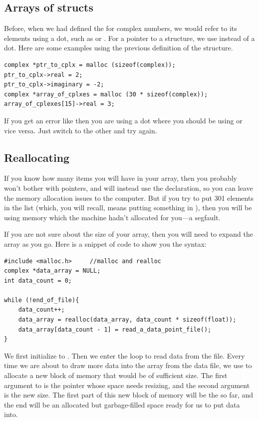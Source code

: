 \subsection{Arrays of structs}	\ckeyind{->}
Before, when we had defined the  for complex numbers, we would refer to its elements using a
dot, such as  or . For a pointer to a structure, we use \ci{->} instead of 
a dot.  Here are some examples using the previous definition of the  structure.
\begin{lstlisting}
complex *ptr_to_cplx = malloc (sizeof(complex));
ptr_to_cplx->real = 2;
ptr_to_cplx->imaginary = -2;
complex *array_of_cplxes = malloc (30 * sizeof(complex));
array_of_cplexes[15]->real = 3;
\end{lstlisting}

If you get an error like  then you are
using a dot where you should be using \ci{->} or vice versa. Just switch to the other and try again.


\subsection{Reallocating} If you know how many items you will have
in your array, then you probably won't bother with pointers, and will
instead use the  declaration, so you can leave
the memory allocation issues to the computer. But if you try to put 301
elements in the list (which, you will recall, means putting something
in ), then you will be using memory which the
machine hadn't
allocated for you---a segfault.

If you are not sure about the size of your array, then you will need to
expand the array as you go. Here is a snippet of code to show you the syntax:
\begin{lstlisting}
#include <malloc.h>     //malloc and realloc
complex *data_array = NULL;
int data_count = 0;

while (!end_of_file){
    data_count++;
    data_array = realloc(data_array, data_count * sizeof(float));
    data_array[data_count - 1] = read_a_data_point_file();
}
\end{lstlisting}

We first initialize  to .
Then
we enter the loop to read data from the file. Every time we are about to draw
more data into the array from the data file, we use  to
allocate a new block of memory that would be of sufficient size. The first
argument to  is the pointer whose space needs resizing,
and the second argument is the new size.  The first part of this new
block of memory will be the  so far, and the end will
be an allocated but garbage-filled space ready for us to put data into.

